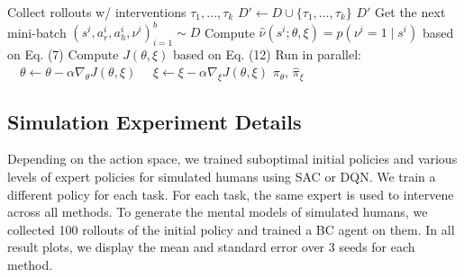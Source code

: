 \begin{algorithm}
\begin{minipage}[c]{0.45\linewidth}
    \end{minipage}
    \begin{minipage}[c]{0.55\linewidth}
    \begin{algorithmic}
        \State Collect rollouts w/ interventions $\tau_1, \ldots, \tau_k$
        \State $D' \gets D \cup \{\tau_1, \ldots, \tau_k\}$
        \State \Return $D'$
    \EndFunction
    \vspace{0.1cm}
                \State Get the next mini-batch $\left(s^i, a_r^i, a_h^i, \nu^i\right)_{i=1}^b \sim D$
                \State Compute $\hat{\nu}(s^i; \theta, \xi) \!=\! p(\nu^i\!=\!1\!\mid\! s^i)$ based on Eq. (7)
                \State Compute $J(\theta, \xi)$ based on Eq. (12)
                \State Run in parallel:
                \State $\quad \theta \gets \theta - \alpha \nabla_\theta J(\theta, \xi)$
                \State $\quad \xi \gets \xi - \alpha \nabla_\xi J(\theta,\xi)$
        \EndFor
        \State \Return $\pi_\theta$, $\hat{\pi}_{\xi}$
    \EndFunction
    
    \end{algorithmic}
    \end{minipage}
    \end{algorithm}
    \vspace{-5px}

\subsection{Simulation Experiment Details}
Depending on the action space, we trained suboptimal initial policies and various levels of expert policies for simulated humans using SAC or DQN. We train a different policy for each task. For each task, the same expert is used to intervene across all methods. To generate the mental models of simulated humans, we collected 100 rollouts of the initial policy and trained a BC agent on them. In all result plots, we display the mean and standard error over 3 seeds for each method.

